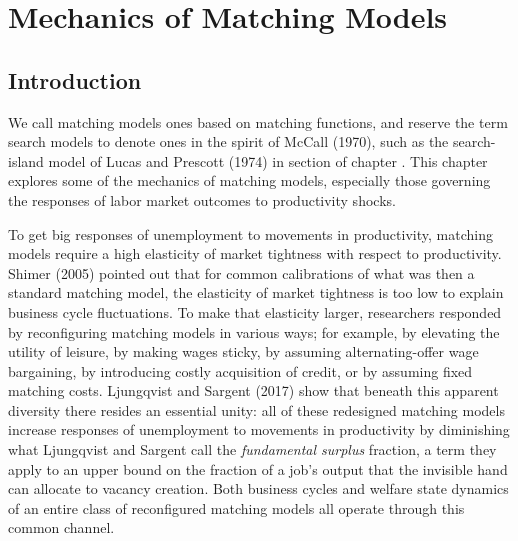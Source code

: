 
%


%
%
\def\lege{\raise.3ex\hbox{$>$\kern-.75em\lower1ex\hbox{$<$}}}

\chapter{Mechanics of Matching Models\label{mechanics_matching}}


\section{Introduction}

We call  matching models ones based on  matching
functions,
and reserve  the term search models to denote ones in the spirit of McCall (1970), such as the search-island
model of Lucas and Prescott (1974) in section 
of  chapter .
This chapter explores some of the mechanics of
matching models, especially those governing the responses of labor market outcomes to productivity shocks.



 To get big responses of unemployment to movements
in productivity, matching models require a high elasticity of market
tightness %
with respect to
productivity.  Shimer (2005) pointed out  that
for common calibrations of what was then a standard matching model, the elasticity
of market tightness is too low to explain business cycle fluctuations.
To make that elasticity larger, researchers responded by reconfiguring
matching models in various ways; for example, by elevating the utility
of leisure, by making wages sticky, by assuming alternating-offer wage
bargaining, by introducing costly acquisition of credit, or by
assuming fixed matching costs.  Ljungqvist and Sargent (2017) show that beneath this apparent
diversity there resides an essential unity: all of these redesigned  matching models increase responses of
unemployment to movements in productivity by diminishing what Ljungqvist and Sargent call the
{\it fundamental surplus} fraction, a term they apply to an upper bound
on the fraction of a job's output that the invisible hand
can allocate to vacancy creation. Both business cycles and
welfare state dynamics of an entire class of reconfigured matching
models all operate through this common channel.


